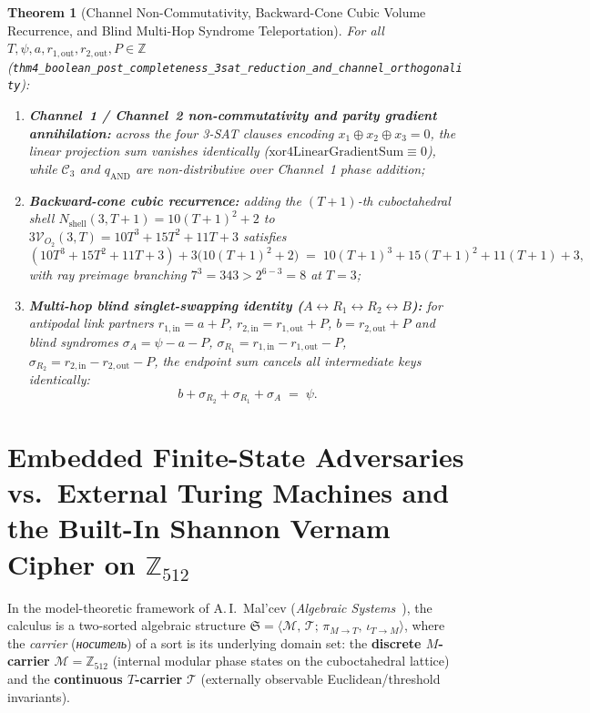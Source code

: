 \documentclass[11pt,a4paper]{article}
\theoremstyle{plain}
\newtheorem{theorem}{Theorem}[section]
\theoremstyle{definition}
\begin{document}
\begin{theorem}[Channel Non-Commutativity, Backward-Cone Cubic Volume Recurrence, and Blind Multi-Hop Syndrome Teleportation]
\label{thm:main-4b}
For all $T,\psi,a,r_{1,\mathrm{out}},r_{2,\mathrm{out}},P\in\mathbb{Z}$ (\texttt{thm4\_boolean\_post\_completeness\_3sat\_reduction\_and\_channel\_orthogonality}):
\begin{enumerate}[label=\textbf{(\roman*)},leftmargin=*,noitemsep]
\item \textbf{Channel~1 / Channel~2 non-commutativity and parity gradient annihilation:}
  across the four 3-SAT clauses encoding $x_1\oplus x_2\oplus x_3=0$, the linear projection sum vanishes identically ($\mathrm{xor4LinearGradientSum}\equiv 0$), while $\mathcal{C}_3$ and $q_{\mathrm{AND}}$ are non-distributive over Channel~1 phase addition;
\item \textbf{Backward-cone cubic recurrence:}
  adding the $(T+1)$-th cuboctahedral shell $N_{\mathrm{shell}}(3,T+1) = 10(T+1)^2+2$ to $3\mathcal{V}_{O_2}(3,T) = 10T^3+15T^2+11T+3$ satisfies
  \[
    (10T^3+15T^2+11T+3) + 3\bigl(10(T+1)^2+2\bigr) \;=\; 10(T+1)^3 + 15(T+1)^2 + 11(T+1) + 3,
  \]
  with ray preimage branching $7^3 = 343 > 2^{6-3} = 8$ at $T=3$;
\item \textbf{Multi-hop blind singlet-swapping identity ($A\leftrightarrow R_1\leftrightarrow R_2\leftrightarrow B$):}
  for antipodal link partners $r_{1,\mathrm{in}} = a+P$, $r_{2,\mathrm{in}} = r_{1,\mathrm{out}}+P$, $b = r_{2,\mathrm{out}}+P$ and blind syndromes $\sigma_A = \psi-a-P$, $\sigma_{R_1} = r_{1,\mathrm{in}}-r_{1,\mathrm{out}}-P$, $\sigma_{R_2} = r_{2,\mathrm{in}}-r_{2,\mathrm{out}}-P$, the endpoint sum cancels all intermediate keys identically:
  \[
    b + \sigma_{R_2} + \sigma_{R_1} + \sigma_A \;=\; \psi.
  \]
\end{enumerate}
\end{theorem}

\section{Embedded Finite-State Adversaries vs.\ External Turing Machines and the Built-In Shannon Vernam Cipher on \texorpdfstring{$\mathbb{Z}_{512}$}{Z512}}
\label{sec:embedded-adversary-vernam}

In the model-theoretic framework of A.\,I.~Mal'cev (\emph{Algebraic Systems}~\cite{Malcev1973}), the calculus is a two-sorted algebraic structure $\mathfrak{S} = \langle \mathcal{M},\,\mathcal{T};\,\pi_{M\to T},\,\iota_{T\to M}\rangle$, where the \emph{carrier} (\emph{носитель}) of a sort is its underlying domain set: the \textbf{discrete $M$-carrier} $\mathcal{M} = \mathbb{Z}_{512}$ (internal modular phase states on the cuboctahedral lattice) and the \textbf{continuous $T$-carrier} $\mathcal{T}$ (externally observable Euclidean/threshold invariants).
\end{document}
